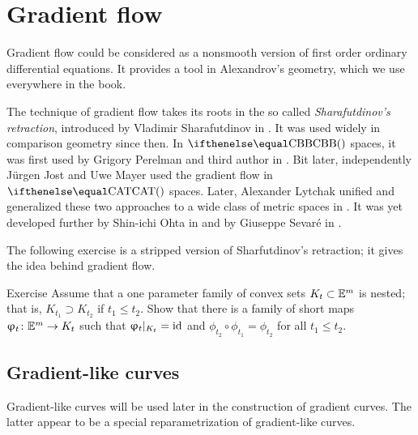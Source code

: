 \chapter{Gradient flow}\label{chap:grad}

Gradient flow could be considered as a nonsmooth version of first order ordinary differential equations.
It provides a tool in Alexandrov's geometry, 
which we use everywhere in the book.

The technique of gradient flow takes its roots in the so called \emph{Sharafutdinov's retraction}, 
introduced by Vladimir Sharafutdinov in \cite{sharafutdinov}.
It was used  widely in comparison geometry since then.
In $\Alex{}$ spaces, it was first used by Grigory Perelman and third author in \cite{perelman-petrunin:qg}.
Bit later, independently J\"urgen Jost and Uwe Mayer \cite{jost,mayer} 
used the gradient flow in $\CAT{}$ spaces.
Later, Alexander Lytchak unified and generalized these two approaches
to a wide class of metric spaces in \cite{lytchak:open-map}.
It was yet developed further by Shin-ichi Ohta in \cite{ohta} and by Giuseppe Sevar\'e in \cite{sevare}.

{\sloppy 
The following exercise is a stripped version of Sharfutdinov's retraction;
it gives the idea behind gradient flow.

}

\begin{thm}{Exercise}\label{ex:sharafutdinov}
Assume that a one parameter family of convex sets $K_t\subset \EE^m$ is nested; 
that is, $K_{t_1}\supset K_{t_2}$ if $t_1\le t_2$.
Show that there is a family of short maps $\phi_t\:\EE^m\to K_t$ 
such that $\upvarphi_t|_{K_t}=\mathop{\rm id}\nolimits$ and $\phi_{t_2}\circ\phi_{t_1}=\phi_{t_2}$ for all $t_1\le t_2$.
\end{thm}





















\section{Gradient-like curves}\label{sec:gradient-like}


Gradient-like curves will be used later in the construction of gradient curves.
The latter appear to be a special reparametrization of gradient-like curves.

